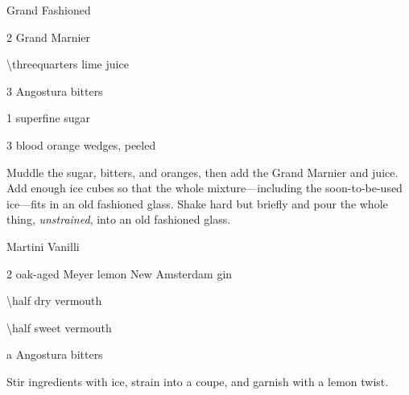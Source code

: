 \begin{EOCocktail}{Grand Fashioned}
	\begin{Ingredients}
	\item \SI{2}{\oz} Grand Marnier
	\item \SI{\threequarters}{\oz} lime juice
	\item 3 \si{\dashes} Angostura bitters
	\item \SI{1}{\tsp} superfine sugar
	\item 3 blood orange wedges, peeled
	\end{Ingredients}
	
	\begin{Instructions}
	Muddle the sugar, bitters, and oranges, then add the Grand Marnier and juice.  Add enough ice cubes so that the whole mixture---including the soon-to-be-used ice---fits in an old fashioned glass.  Shake hard but briefly and pour the whole thing, \emph{unstrained}, into an old fashioned glass.
	\end{Instructions}
\end{EOCocktail}

\begin{Cocktail*}{Martini Vanilli}
	\begin{Ingredients}
	\item \SI{2}{\oz} oak-aged Meyer lemon New Amsterdam gin
	\item \SI{\half}{\oz} dry vermouth
	\item \SI{\half}{\oz} sweet vermouth
	\item a \si{\dash} Angostura bitters %
	\end{Ingredients}
	
	\begin{Instructions}
	Stir ingredients with ice, strain into a coupe, and garnish with a lemon twist.
	\end{Instructions}
\end{Cocktail*}

